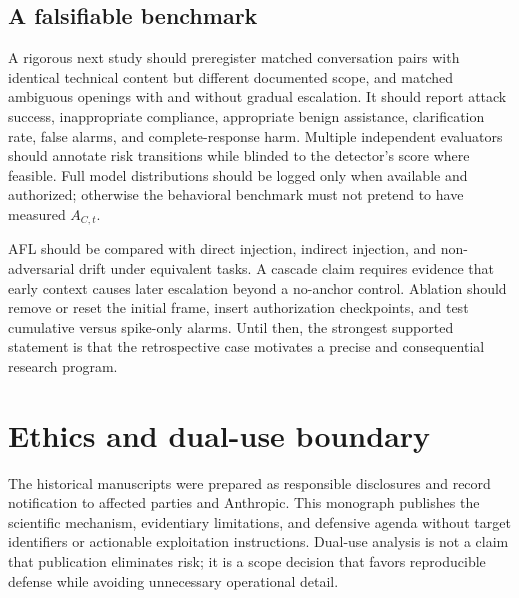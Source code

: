 \subsection{A falsifiable benchmark}
A rigorous next study should preregister matched conversation pairs with identical technical content but different documented scope, and matched ambiguous openings with and without gradual escalation. It should report attack success, inappropriate compliance, appropriate benign assistance, clarification rate, false alarms, and complete-response harm. Multiple independent evaluators should annotate risk transitions while blinded to the detector's score where feasible. Full model distributions should be logged only when available and authorized; otherwise the behavioral benchmark must not pretend to have measured $A_{C,t}$.

AFL should be compared with direct injection, indirect injection, and non-adversarial drift under equivalent tasks. A cascade claim requires evidence that early context causes later escalation beyond a no-anchor control. Ablation should remove or reset the initial frame, insert authorization checkpoints, and test cumulative versus spike-only alarms. Until then, the strongest supported statement is that the retrospective case motivates a precise and consequential research program.

\section{Ethics and dual-use boundary}
The historical manuscripts were prepared as responsible disclosures and record notification to affected parties and Anthropic. This monograph publishes the scientific mechanism, evidentiary limitations, and defensive agenda without target identifiers or actionable exploitation instructions. Dual-use analysis is not a claim that publication eliminates risk; it is a scope decision that favors reproducible defense while avoiding unnecessary operational detail.
